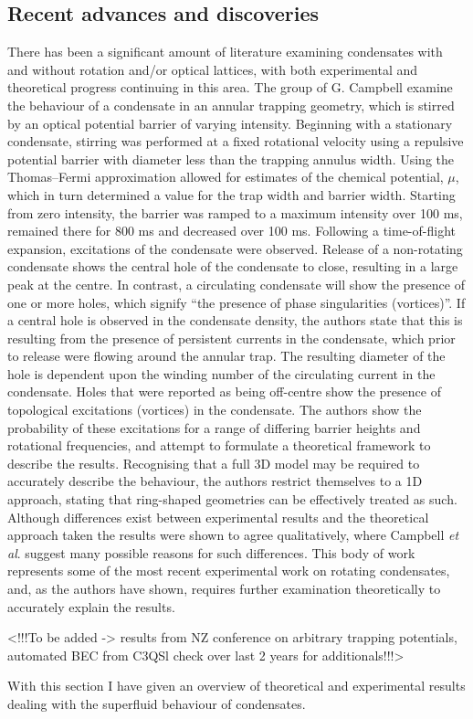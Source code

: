 \subsection{Recent advances and discoveries}
There has been a significant amount of literature examining condensates with and without rotation and/or optical lattices, with both experimental and theoretical progress continuing in this area. The group of G. Campbell \cite{Vtx:Wright_pra_2013} examine the behaviour of a condensate in an annular trapping geometry, which is stirred by an optical potential barrier of varying intensity. Beginning with a stationary condensate, stirring was performed at a fixed rotational velocity using a repulsive potential barrier with diameter less than the trapping annulus width. Using the Thomas--Fermi approximation allowed for estimates of the chemical potential, $\mu$, which in turn determined a value for the trap width and barrier width. Starting from zero intensity, the barrier was ramped to a maximum intensity over 100 ms, remained there for 800 ms and decreased over 100 ms. Following a time-of-flight expansion, excitations of the condensate were observed. Release of a non-rotating condensate shows the central hole of the condensate to close, resulting in a large peak at the centre. In contrast, a circulating condensate will show the presence of one or more holes, which signify ``the presence of phase singularities (vortices)''. If a central hole is observed in the condensate density, the authors state that this is resulting from the presence of persistent currents in the condensate, which prior to release were flowing around the annular trap. The resulting diameter of the hole is dependent upon the winding number of the circulating current in the condensate. Holes that were reported as being off-centre show the presence of topological excitations (vortices) in the condensate.  The authors show the probability of these excitations for a range of differing barrier heights and rotational frequencies, and attempt to formulate a theoretical framework to describe the results. Recognising that a full 3D model may be required to accurately describe the behaviour, the authors restrict themselves to a 1D approach, stating that ring-shaped geometries can be effectively treated as such. Although differences exist between experimental results and the theoretical approach taken the results were shown to agree qualitatively, where Campbell \textit{et al}. suggest many possible reasons for such differences. This body of work represents some of the most recent experimental work on rotating condensates, and, as the authors have shown, requires further examination theoretically to accurately explain the results.

<!!!To be added -> results from NZ conference on arbitrary trapping potentials, automated BEC from C3QSl check over last 2 years for additionals!!!>

With this section I have given an overview of theoretical and experimental results dealing with the superfluid behaviour of condensates. 
